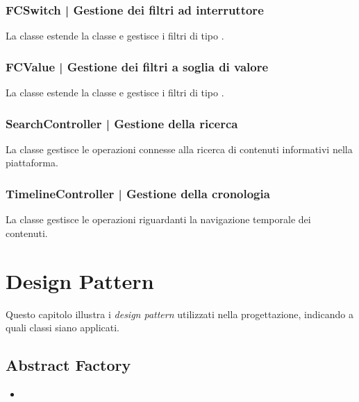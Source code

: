 \documentclass[10pt,a4paper,headinclude,footinclude,hidelinks]{scrreprt} %
\begin{document}
	\subsection[FCSwitch]{FCSwitch | Gestione dei filtri ad interruttore}
	\label{sec:stage:design:controller:filter-switch}
	La classe \textit{} estende la classe \textit{} e gestisce i filtri di tipo \textit{}.

	\subsection[FCValue]{FCValue | Gestione dei filtri a soglia di valore}
	\label{sec:stage:design:controller:filter-value}
	La classe \textit{} estende la classe \textit{} e gestisce i filtri di tipo \textit{}.

	\subsection[SearchController]{SearchController | Gestione della ricerca}
	\label{sec:stage:design:controller:search}
	La classe \textit{} gestisce le operazioni connesse alla ricerca di contenuti informativi nella piattaforma.	

	\subsection[TimelineController]{TimelineController | Gestione della cronologia}
	\label{sec:stage:design:controller:timeline}
	La classe \textit{} gestisce le operazioni riguardanti la navigazione temporale dei contenuti.

	\chapter{Design Pattern}
	\label{ch:stage:design:pattern}
	Questo capitolo illustra i \textit{design pattern} utilizzati nella progettazione, indicando a quali classi siano applicati.

	\section{Abstract Factory}
	\label{sec:stage:design:pattern:factory}
	\begin{itemize}
	\item {}
	\end{itemize}
\end{document}
